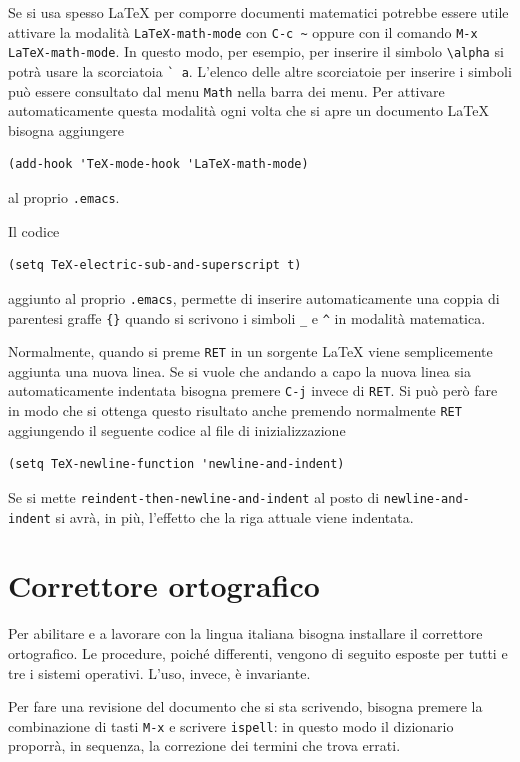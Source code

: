\documentclass[11pt,a4paper]{article}
\begin{document}
Se si usa spesso \LaTeX{} per comporre documenti matematici potrebbe essere
utile attivare la modalità \verb!LaTeX-math-mode! con \verb!C-c ~! oppure con il
comando \verb!M-x LaTeX-math-mode!.  In questo modo, per esempio, per inserire
il simbolo \verb!\alpha! si potrà usare la scorciatoia \verb!` a!.  L'elenco
delle altre scorciatoie per inserire i simboli può essere consultato dal menu
\verb!Math! nella barra dei menu.  Per attivare automaticamente questa modalità
ogni volta che si apre un documento \LaTeX{} bisogna aggiungere
\begin{Verbatim}
(add-hook 'TeX-mode-hook 'LaTeX-math-mode)
\end{Verbatim}
al proprio \verb!.emacs!.

Il codice
\begin{Verbatim}
(setq TeX-electric-sub-and-superscript t)
\end{Verbatim}
aggiunto al proprio \verb!.emacs!, permette di inserire automaticamente una
coppia di parentesi graffe \verb!{}! quando si scrivono i simboli \verb!_! e
\verb!^! in modalità matematica.

Normalmente, quando si preme \verb!RET! in un sorgente \LaTeX{} viene
semplicemente aggiunta una nuova linea.  Se si vuole che andando a capo la nuova
linea sia automaticamente indentata bisogna premere \verb!C-j! invece di
\verb!RET!.  Si può però fare in modo che si ottenga questo risultato anche
premendo normalmente \verb!RET! aggiungendo il seguente codice al file di
inizializzazione
\begin{Verbatim}
(setq TeX-newline-function 'newline-and-indent)
\end{Verbatim}
Se si mette \verb!reindent-then-newline-and-indent! al posto di
\verb!newline-and-indent! si avrà, in più, l'effetto che la riga attuale viene
indentata.

\section{Correttore ortografico}
\label{sec:corr}

Per abilitare \emacs{} e \auctex{} a lavorare con la lingua italiana bisogna
installare il correttore ortografico. Le procedure, poiché differenti, vengono
di seguito esposte per tutti e tre i sistemi operativi.  L'uso, invece, è
invariante.

Per fare una revisione del documento che si sta scrivendo, bisogna premere la
combinazione di tasti \verb!M-x! e scrivere \verb!ispell!: in questo modo il
dizionario proporrà, in sequenza, la correzione dei termini che trova errati.
\end{document}
